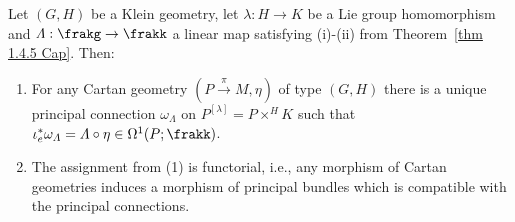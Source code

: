 \begin{thm}\label{thm 1.5.6 Cap}
    Let $(G,H)$ be a Klein geometry, let $\lambda:H\to K$ be a Lie group homomorphism and $\varLambda:\frakg\to \frakk$ a linear map satisfying (i)-(ii) from Theorem~\ref{thm 1.4.5 Cap}. Then:
    \begin{enumerate}[label=(\arabic*)]
        \item For any Cartan geometry $(P\overset{\pi}{\to} M,\eta)$ of type $(G,H)$ there is a unique principal connection $\omega_\varLambda$ on $P^{[\lambda]}=P\times^H K$ such that $\iota_e^\ast \omega_\varLambda=\varLambda\circ \eta\in\Omega^1({P;\frakk})$.
        \item The assignment from (1) is functorial, i.e., any morphism of Cartan geometries induces a morphism of principal bundles which is compatible with the principal connections.
    \end{enumerate}
\end{thm}
